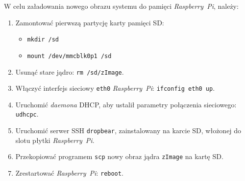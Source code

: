 \documentclass{article}
\begin{document}
W celu załadowania nowego obrazu systemu do pamięci \emph{Raspberry~Pi}, należy:
\begin{enumerate}
\item Zamontować pierwszą partycję karty pamięci SD:
\begin{itemize}
\item \texttt{mkdir /sd}
\item \texttt{mount /dev/mmcblk0p1 /sd}
\end{itemize}
\item Usunąć stare jądro: \texttt{rm /sd/zImage}.
\item Włączyć interfejs sieciowy \texttt{eth0} \emph{Raspberry~Pi}: \texttt{ifconfig eth0 up}.
\item Uruchomić \emph{daemona} DHCP, aby ustalił parametry połączenia sieciowego: \texttt{udhcpc}.
\item Uruchomić serwer SSH \texttt{dropbear}, zainstalowany na karcie SD, włożonej do slotu płytki \emph{Raspberry~Pi}.
\item Przekopiować programem \texttt{scp} nowy obraz jądra \texttt{zImage} na kartę SD.
\item Zrestartować \emph{Raspberry~Pi}: \texttt{reboot}.
\end{enumerate}




\end{document}
